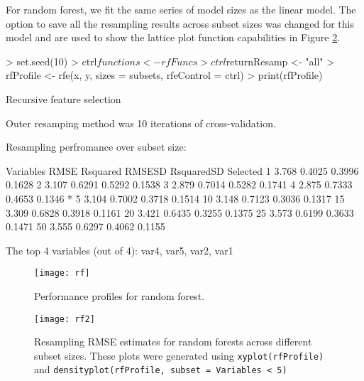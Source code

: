 \documentclass[12pt]{article}
\begin{document}
For random forest, we fit the same series of model sizes as the linear model. The option to save all the resampling results across subset sizes was changed for this model and are used to show the lattice plot function capabilities in Figure \ref{F:rf2}.
\begin{Schunk}
\begin{Sinput}
> set.seed(10)
> ctrl$functions <- rfFuncs
> ctrl$returnResamp <- "all"
> rfProfile <- rfe(x, y, sizes = subsets, rfeControl = ctrl)
> print(rfProfile)
\end{Sinput}
\begin{Soutput}
Recursive feature selection

Outer resamping method was 10 iterations of cross-validation. 

Resampling perfromance over subset size:

 Variables  RMSE Rsquared RMSESD RsquaredSD Selected
         1 3.768   0.4025 0.3996     0.1628         
         2 3.107   0.6291 0.5292     0.1538         
         3 2.879   0.7014 0.5282     0.1741         
         4 2.875   0.7333 0.4653     0.1346        *
         5 3.104   0.7002 0.3718     0.1514         
        10 3.148   0.7123 0.3036     0.1317         
        15 3.309   0.6828 0.3918     0.1161         
        20 3.421   0.6435 0.3255     0.1375         
        25 3.573   0.6199 0.3633     0.1471         
        50 3.555   0.6297 0.4062     0.1155         

The top 4 variables (out of 4):
   var4, var5, var2, var1
\end{Soutput}
\end{Schunk}

\begin{figure}
   \begin{center}		
      \texttt{[image: rf]}
      \caption{Performance profiles for random forest.}
      \label{F:rf} 
    \end{center}
\end{figure}

\begin{figure}
   \begin{center}		
      \texttt{[image: rf2]}
      \caption{Resampling RMSE estimates for random forests across different subset sizes. These plots were generated using \texttt{xyplot(rfProfile)} and \texttt{densityplot(rfProfile, subset = Variables < 5)}}
      \label{F:rf2} 
    \end{center}
\end{figure}
\end{document}
